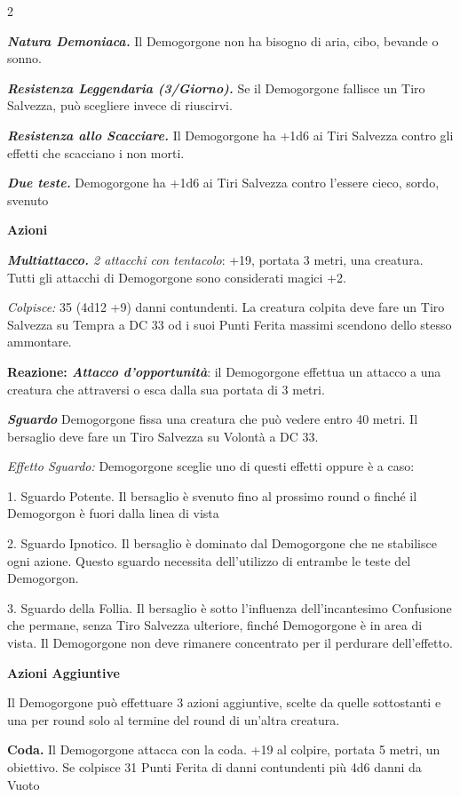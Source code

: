 \begin{multicols}{2}
{\emph{\textbf{Natura Demoniaca.}} Il Demogorgone non ha bisogno di aria, cibo, bevande o sonno.

\emph{\textbf{Resistenza Leggendaria (3/Giorno).}} Se il Demogorgone fallisce un Tiro Salvezza, può scegliere invece di riuscirvi.

\emph{\textbf{Resistenza allo Scacciare.}} Il Demogorgone ha +1d6 ai Tiri Salvezza contro gli effetti che scacciano i non morti.

\emph{\textbf{Due teste.}} Demogorgone ha +1d6 ai Tiri Salvezza contro l'essere cieco, sordo, svenuto

\textbf{Azioni}

\emph{\textbf{Multiattacco.} 2 attacchi con tentacolo}: +19, portata 3 metri, una creatura. Tutti gli attacchi di Demogorgone sono considerati magici +2.

\emph{Colpisce:} 35 (4d12 +9) danni contundenti. La creatura colpita deve fare un Tiro Salvezza su Tempra a DC 33 od i suoi Punti Ferita massimi scendono dello stesso ammontare.

\textbf{Reazione: \emph{Attacco d'opportunità}}: il Demogorgone effettua un attacco a una creatura che attraversi o esca dalla sua portata di 3 metri.

\emph{\textbf{Sguardo}} Demogorgone fissa una creatura che può vedere entro 40 metri. Il bersaglio deve fare un Tiro Salvezza su Volontà a DC 33.

\emph{Effetto Sguardo:} Demogorgone sceglie uno di questi effetti oppure è a caso:

1. Sguardo Potente. Il bersaglio è svenuto fino al prossimo round o finché il Demogorgon è fuori dalla linea di vista

2. Sguardo Ipnotico. Il bersaglio è dominato dal Demogorgone che ne stabilisce ogni azione. Questo sguardo necessita dell'utilizzo di entrambe le teste del Demogorgon.

3. Sguardo della Follia. Il bersaglio è sotto l'influenza dell'incantesimo Confusione che permane, senza Tiro Salvezza ulteriore, finché Demogorgone è in area di vista. Il Demogorgone non deve rimanere concentrato per il perdurare dell'effetto.


\textbf{Azioni Aggiuntive}

Il Demogorgone può effettuare 3 azioni aggiuntive, scelte da quelle sottostanti e una per round solo al termine del round di un'altra creatura.

\textbf{Coda.} Il Demogorgone attacca con la coda. +19 al colpire, portata 5 metri, un obiettivo. Se colpisce 31 Punti Ferita di danni contundenti più 4d6 danni da Vuoto

}
\end{multicols}
